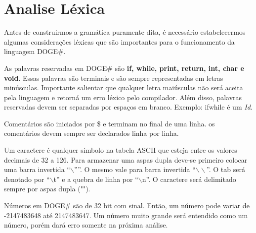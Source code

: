 \documentclass{scrreprt}
\begin{document}
\section{Analise Léxica}
Antes de construirmos a gramática puramente dita, é necessário estabelecermos algumas considerações léxicas que são importantes para o funcionamento da linguagem DOGE\#. 
\par As palavras reservadas em DOGE\# são \textbf{if, while, print, return, int, char e void}. Essas palavras são terminais e são sempre representadas em letras minúsculas. Importante salientar que qualquer letra maiúsculas não será aceita pela linguagem e retorná um erro léxico pelo compilador. Além disso, palavras reservadas devem ser separadas por espaços em branco. Exemplo: ifwhile é um \textit{Id}.               
\par Comentários são iniciados por \$ e terminam no final de uma linha. os comentários devem sempre ser declarados linha por linha. 

\par Um caractere é qualquer símbolo na tabela ASCII que esteja entre os valores decimais de 32 a 126. Para armazenar uma aspas dupla deve-se primeiro colocar uma barra invertida “$\backslash$””. O mesmo vale para barra invertida “$\backslash\backslash$”. O tab será denotado por “$\backslash$t” e a quebra de linha por “$\backslash$n”. O caractere será delimitado sempre por aspas dupla (""). 
\par Números em DOGE\# são de 32 bit com sinal. Então, um número pode variar de -2147483648 até 2147483647. Um número muito grande será entendido como um número, porém dará erro somente na próxima análise.
\end{document}
